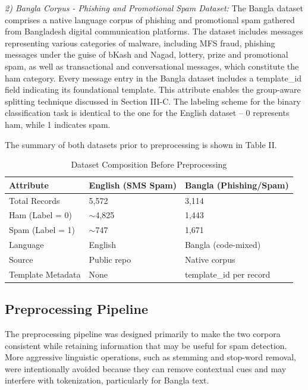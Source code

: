 \documentclass[journal]{IEEEtran}
\begin{document}
\textit{2) Bangla Corpus - Phishing and Promotional Spam Dataset:} The
Bangla dataset comprises a native language corpus of phishing and
promotional spam gathered from Bangladesh digital communication
platforms. The dataset includes messages representing various
categories of malware, including MFS fraud, phishing messages under the
guise of bKash and Nagad, lottery, prize and promotional spam, as well
as transactional and conversational messages, which constitute the ham
category. Every message entry in the Bangla dataset includes a template\_id field indicating its foundational template. This attribute enables the group-aware
splitting technique discussed in Section III-C. The labeling scheme for
the binary classification task is identical to the one for the English
dataset -- 0 represents ham, while 1 indicates spam.

The summary of both datasets prior to preprocessing is shown in Table
II.

\begin{table}[htbp]
\caption{Dataset Composition Before Preprocessing}
\label{tab:dataset_raw}
\centering
\begin{tabular}{lll}
\toprule
\textbf{Attribute} & \textbf{English (SMS Spam)} & \textbf{Bangla (Phishing/Spam)} \\
\midrule
Total Records & 5,572 & 3,114 \\
Ham (Label = 0) & $\sim$4,825 & 1,443 \\
Spam (Label = 1) & $\sim$747 & 1,671 \\
Language & English & Bangla (code-mixed) \\
Source & Public repo \cite{ref1} & Native corpus \\
Template Metadata & None & template\_id per record \\
\bottomrule
\end{tabular}
\end{table}

\subsection{Preprocessing Pipeline}

The preprocessing pipeline was designed primarily to make the two corpora consistent while retaining information that may be useful for spam detection. More aggressive linguistic operations, such as stemming and stop-word removal, were intentionally avoided because they can remove contextual cues and may interfere with tokenization, particularly for Bangla text.
\end{document}
